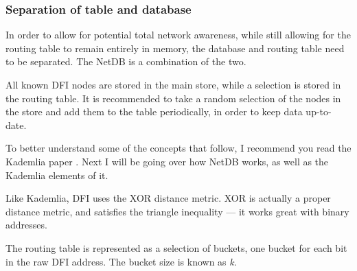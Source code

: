 	\newpage
		\subsubsection{Separation of table and database}
		\begin{multicols}{2}
		In order to allow for potential total network awareness, while still
		allowing for the routing table to remain entirely in memory, the 
		database and routing table need to be separated. The NetDB is a combination of the two.

		All known DFI nodes are stored in the main store, while a selection is
		stored in the routing table. It is recommended to take a
		random selection of the nodes in the store and add them to the table
		periodically, in order to keep data up-to-date.

		To better understand some of the concepts that follow, I recommend you
		read the Kademlia paper \cite{kademlia}. Next I will be going over how NetDB works, as
		well as the Kademlia elements of it.

		Like Kademlia, DFI uses the XOR distance metric. XOR is actually a
		proper distance metric, and satisfies the triangle inequality --- it works great
		with binary addresses.

		The routing table is represented as a selection of buckets, one bucket
		for each bit in the raw DFI address. The bucket size is known as
		\textit{k}.
	\end{multicols}

